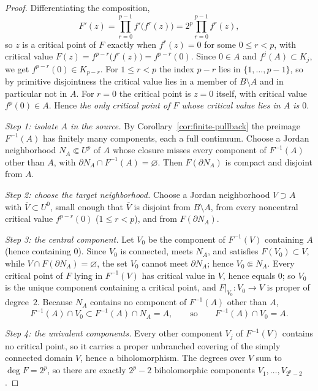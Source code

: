 \begin{proof}
Differentiating the composition,
\[
 F'(z)=\prod_{r=0}^{p-1}f'\bigl(f^{r}(z)\bigr)
      =2^{p}\prod_{r=0}^{p-1}f^{r}(z),
\]
so $z$ is a critical point of $F$ exactly when $f^{r}(z)=0$ for some
$0\le r<p$, with critical value
$F(z)=f^{p-r}\bigl(f^{r}(z)\bigr)=f^{p-r}(0)$.  Since $0\in A$ and
$f^{j}(A)\subset K_{j}$, we get $f^{p-r}(0)\in K_{p-r}$.  For
$1\le r<p$ the index $p-r$ lies in $\{1,\dots,p-1\}$, so by primitive
disjointness the critical value lies in a member of $B\setminus A$ and
in particular not in $A$.  For $r=0$ the critical point is $z=0$
itself, with critical value $f^{p}(0)\in A$.  Hence \emph{the only
critical point of $F$ whose critical value lies in $A$ is $0$}.

\emph{Step 1: isolate $A$ in the source.}  By
Corollary~\ref{cor:finite-pullback} the preimage $F^{-1}(A)$ has
finitely many components, each a full continuum.  Choose a Jordan
neighborhood $N_A\Subset U^{p}$ of $A$ whose closure misses every
component of $F^{-1}(A)$ other than $A$, with
$\partial N_A\cap F^{-1}(A)=\varnothing$.  Then $F(\partial N_A)$ is
compact and disjoint from $A$.

\emph{Step 2: choose the target neighborhood.}  Choose a Jordan
neighborhood $V\supset A$ with $\overline V\subset U^{0}$, small enough
that $\overline V$ is disjoint from $B\setminus A$, from every
noncentral critical value $f^{p-r}(0)$ ($1\le r<p$), and from
$F(\partial N_A)$.

\emph{Step 3: the central component.}  Let $V_0$ be the component of
$F^{-1}(V)$ containing $A$ (hence containing $0$).  Since $V_0$ is
connected, meets $N_A$, and satisfies
$F(V_0)\subset V$, while $V\cap F(\partial N_A)=\varnothing$, the set
$V_0$ cannot meet $\partial N_A$; hence $V_0\Subset N_A$.  Every
critical point of $F$ lying in $F^{-1}(V)$ has critical value in $V$,
hence equals $0$; so $V_0$ is the unique component containing a
critical point, and $F|_{V_0}\colon V_0\to V$ is proper of
degree~$2$.  Because $N_A$ contains no component of $F^{-1}(A)$ other
than $A$,
\[
 F^{-1}(A)\cap V_0\subset F^{-1}(A)\cap N_A=A ,
 \qquad\text{so}\qquad
 F^{-1}(A)\cap V_0=A .
\]

\emph{Step 4: the univalent components.}  Every other component $V_j$
of $F^{-1}(V)$ contains no critical point, so it carries a proper
unbranched covering of the simply connected domain $V$, hence a
biholomorphism.  The degrees over $V$ sum to $\deg F=2^{p}$, so there
are exactly $2^{p}-2$ biholomorphic components
$V_1,\dots,V_{2^{p}-2}$.


\end{proof}
